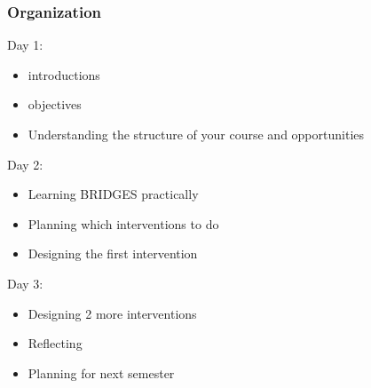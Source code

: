 \documentclass[aspectratio=169]{beamer}
\begin{document}
\begin{frame}
  \frametitle{Organization}

  Day 1:
  \begin{itemize}
  \item introductions
  \item objectives
  \item Understanding the structure of your course and opportunities
  \end{itemize}
  
  Day 2:
  \begin{itemize}
  \item Learning BRIDGES practically
  \item Planning which interventions to do
  \item Designing the first intervention
  \end{itemize}

  
  Day 3:
  \begin{itemize}
  \item Designing 2 more interventions
  \item Reflecting
  \item Planning for next semester
  \end{itemize}
  
\end{frame}
\end{document}
